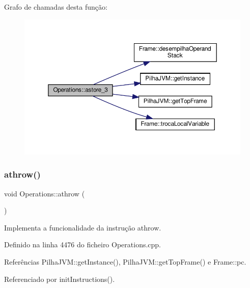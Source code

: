 Grafo de chamadas desta função\+:\nopagebreak
\begin{figure}[H]
\begin{center}
\leavevmode
\includegraphics[width=350pt]{classOperations_ac3c02b3ff78b6222bd58bebb4f01c083_cgraph}
\end{center}
\end{figure}
\mbox{\label{classOperations_a2a5eea0fb18391bb3854dfe55c8ac5d3}} 
\subsubsection{\texorpdfstring{athrow()}{athrow()}}
{\footnotesize\ttfamily void Operations\+::athrow (\begin{DoxyParamCaption}{ }\end{DoxyParamCaption})\hspace{0.3cm}{\ttfamily [private]}}



Implementa a funcionalidade da instrução athrow. 



Definido na linha 4476 do ficheiro Operations.\+cpp.



Referências Pilha\+J\+V\+M\+::get\+Instance(), Pilha\+J\+V\+M\+::get\+Top\+Frame() e Frame\+::pc.



Referenciado por init\+Instructions().

